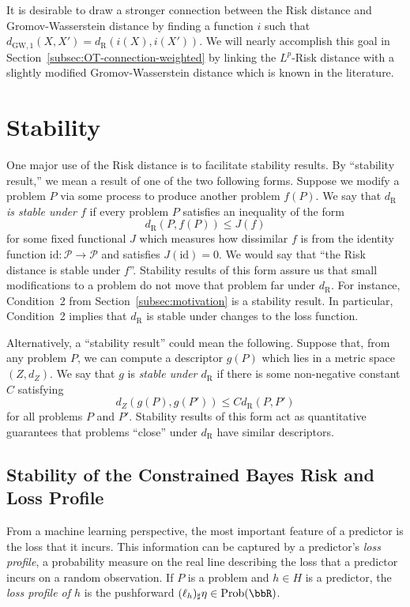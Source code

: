 \documentclass[twoside,11pt]{article}
\DeclareMathOperator{\prob}{Prob}
\newcommand{\dexp}[1][]{d_{\mathrm{R}#1}}
\begin{document}
    It is desirable to draw a stronger connection between the Risk distance and Gromov-Wasserstein distance by finding a function $i$ such that $d_{\mathrm{GW},1}(X,X') = \dexp(i(X),i(X'))$. We will nearly accomplish this goal in Section~\ref{subsec:OT-connection-weighted} by linking the $L^p$-Risk distance with a slightly modified Gromov-Wasserstein distance which is known in the literature. 

\section{Stability}\label{sec:stability} 
One major use of the Risk distance is to facilitate stability results.
By ``stability result,'' we mean a result of one of the two following forms. Suppose we modify a problem $P$ via some process to produce another problem $f(P)$. We say that \emph{$\dexp$ is stable under $f$} if every problem $P$ satisfies an inequality of the form
\[\dexp(P,f(P)) \leq J(f)\]
for some fixed functional $J$ which measures how dissimilar $f$ is from the identity function $\mathrm{id}:\mathcal{P}\to \mathcal{P}$ and satisfies $J(\mathrm{id})=0$. We would say that ``the Risk distance is stable under $f$''.
Stability results of this form assure us that small modifications to a problem do not move that problem far under $\dexp$. For instance, Condition~2 from Section~\ref{subsec:motivation} is a stability result. In particular, Condition~2 implies that $\dexp$ is stable under changes to the loss function.

Alternatively, a ``stability result'' could mean the following. Suppose that, from any problem $P$, we can compute a descriptor $g(P)$ which lies in a metric space $(Z,d_Z)$. We say that $g$ is \emph{stable under $\dexp$} if there is some non-negative constant $C$ satisfying
\[d_Z(g(P),g(P')) \leq C \dexp(P,P')\]
for all problems $P$ and $P'$. Stability results of this form act as quantitative guarantees that problems ``close'' under $\dexp$ have similar descriptors.

\subsection{Stability of the Constrained Bayes Risk and Loss Profile}\label{subsec:loss-control}
From a machine learning perspective, the most important feature of a predictor is the loss that it incurs. This information can be captured by a predictor's \emph{loss profile}, a probability measure on the real line describing the loss that a predictor incurs on a random observation. If $P$ is a problem and $h \in H$ is a predictor, the \emph{loss profile of $h$} is the pushforward $(\ell_h)_\sharp \eta \in \prob(\bbR)$.
\end{document}
